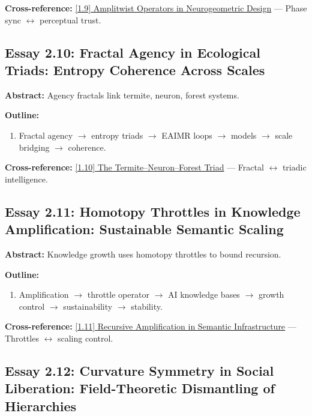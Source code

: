 \documentclass[12pt,a4paper]{article}
\begin{document}
\textbf{Cross-reference:} \hyperref[sec:essay1-9]{[1.9] Amplitwist Operators in Neurogeometric Design} --- Phase sync $\leftrightarrow$ perceptual trust.

\subsection{Essay 2.10: Fractal Agency in Ecological Triads: Entropy Coherence Across Scales}
\label{sec:essay2-10}

\textbf{Abstract:} Agency fractals link termite, neuron, forest systems.

\textbf{Outline:}
\begin{enumerate}
\item Fractal agency $\to$ entropy triads $\to$ EAIMR loops $\to$ models $\to$ scale bridging $\to$ coherence.
\end{enumerate}

\textbf{Cross-reference:} \hyperref[sec:essay1-10]{[1.10] The Termite--Neuron--Forest Triad} --- Fractal $\leftrightarrow$ triadic intelligence.

\subsection{Essay 2.11: Homotopy Throttles in Knowledge Amplification: Sustainable Semantic Scaling}
\label{sec:essay2-11}

\textbf{Abstract:} Knowledge growth uses homotopy throttles to bound recursion.

\textbf{Outline:}
\begin{enumerate}
\item Amplification $\to$ throttle operator $\to$ AI knowledge bases $\to$ growth control $\to$ sustainability $\to$ stability.
\end{enumerate}

\textbf{Cross-reference:} \hyperref[sec:essay1-11]{[1.11] Recursive Amplification in Semantic Infrastructure} --- Throttles $\leftrightarrow$ scaling control.

\subsection{Essay 2.12: Curvature Symmetry in Social Liberation: Field-Theoretic Dismantling of Hierarchies}
\label{sec:essay2-12}
\end{document}
